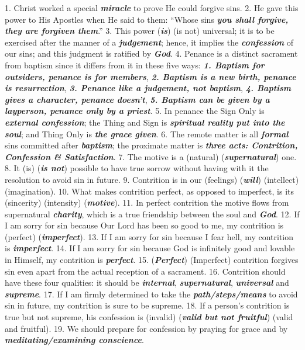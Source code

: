 \documentclass[a5paper]{article}
\newcommand\answer[1]{\textbf{\textit{#1}}}
\begin{document}
\newpage

1. Christ worked a special \answer{miracle} to prove He could forgive sins.
2. He gave this power to His Apostles when He said to them: “Whose sins \answer{you shall forgive, they are forgiven them}.”
3. This power (\answer{is}) (is not) universal; it is to be exercised after the manner of a \answer{judgement}; hence, it implies the \answer{confession} of our sins; and this judgment is ratified by \answer{God}.
4. Penance is a distinct sacrament from baptism since it differs from it in these five ways: \answer{1. Baptism for outsiders, penance is for members}, \answer{2. Baptism is a new birth, penance is resurrection}, \answer{3. Penance like a judgement, not baptism}, \answer{4. Baptism gives a character, penance doesn't}, \answer{5. Baptism can be given by a layperson, penance only by a priest}.
5. In penance the Sign Only is \answer{external confession}; the Thing and Sign is \answer{spiritual reality put into the soul}; and Thing Only is \answer{the grace given}.
6. The remote matter is all \answer{formal} sins committed after \answer{baptism}; the proximate matter is \answer{three acts: Contrition, Confession \& Satisfaction}.
7. The motive is a (natural) (\answer{supernatural}) one.
8. It (is) (\answer{is not}) possible to have true sorrow without having with it the resolution to avoid sin in future.
9. Contrition is in our (feelings) (\answer{will}) (intellect) (imagination).
10. What makes contrition perfect, as opposed to imperfect, is its (sincerity) (intensity) (\answer{motive}).
11. In perfect contrition the motive flows from supernatural \answer{charity}, which is a true friendship between the soul and \answer{God}.
12. If I am sorry for sin because Our Lord has been so good to me, my contrition is (perfect) (\answer{imperfect}).
13. If I am sorry for sin because I fear hell, my contrition is \answer{imperfect}.
14. If I am sorry for sin because God is infinitely good and lovable in Himself, my contrition is \answer{perfect}.
15. (\answer{Perfect}) (Imperfect) contrition forgives sin even apart from the actual reception of a sacrament.
16. Contrition should have these four qualities: it should be \answer{internal}, \answer{supernatural}, \answer{universal} and \answer{supreme}.
17. If I am firmly determined to take the \answer{path/steps/means} to avoid sin in future, my contrition is sure to be supreme.
18. If a person's contrition is true but not supreme, his confession is (invalid) (\answer{valid but not fruitful}) (valid and fruitful).
19. We should prepare for confession by praying for grace and by \answer{meditating/examining conscience}.
\end{document}
